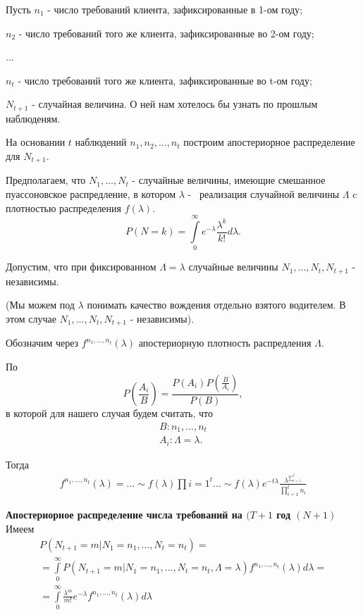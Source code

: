 Пусть $n_1$ - число требований клиента, зафиксированные в 1-ом году;

$ n_2$ - число требований того же клиента, зафиксированные во 2-ом году;

...

$n_t$ - число требований того же клиента, зафиксированные во t-ом году;

$N_{t+1}$ - случайная величина. О ней нам хотелось бы узнать по прошлым наблюденям.

На основании $t$ наблюдений $n_1, n_2, ..., n_t$ построим апостериорное распределение для $N_{t+1}$.

Предполагаем, что $N_1, ..., N_t$ - случайные величины, имеющие смешанное пуассоновское распредление, в котором $\lambda$ -  реализация случайной величины $\Lambda$ c плотностью распределения $f(\lambda)$.
\[ P(N = k) = \int\limits^{\infty}_{0}e^{-\lambda}\frac{\lambda^k}{k!}d\lambda. \]

Допустим, что при фиксированном $\Lambda = \lambda$ случайные величины $N_1, ..., N_t, N_{t+1}$ - независимы. 

(Мы можем под $\lambda$ понимать качество вождения отдельно взятого водителем. В этом случае $N_1, ..., N_t, N_{t+1}$ - независимы).

Обозначим через $f^{n_1,...,n_t}(\lambda)$ апостериорную плотность распредления $\Lambda$.

По  
\[ P(\frac{A_i}{B}) = \frac{P(A_i)P(\frac{B}{A_i})}{P(B)}, \] 
в которой для нашего случая будем считать, что 
\begin{gather*}
	B: n_1,...,n_t\\
	A_i: \Lambda = \lambda.
\end{gather*}

Тогда
\begin{gather*}
	f^{n_1,...,n_t}(\lambda) = ...\sim f(\lambda)\prod\limits{i=1}^t...\sim f(\lambda)e^{-t\lambda}\frac{\lambda^{\sum\limits_{i=1}^{t}}}{\prod\limits_{i=1}^{t}n_i}
\end{gather*}

\textbf{Апостериорное распределение числа требований на $(T+1$ год $(N+1)$}
Имеем
\begin{gather*}
	P(N_{t+1} = m| N_1 = n_1,..., N_t = n_t) =\\
	= \int\limits^{\infty}_{0} P(N_{t+1}= m | N_1 = n_1, ..., N_t=n_t, \Lambda = \lambda)f^{n_1,...,n_t}(\lambda)d\lambda=\\
	= \int\limits^{\infty}_{0}\frac{\lambda^m}{m!}e^{-\lambda}f^{n_1,...,n_t}(\lambda)d\lambda
\end{gather*}

